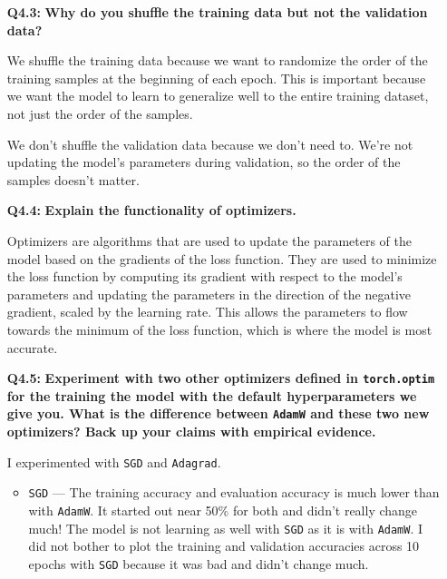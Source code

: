 \documentclass{article}
\begin{document}
\begin{itemize}
\begin{itemize}
        \item[\textbf{Q4.3:}] \textbf{Why do you shuffle the training data but
        not the validation data?}

        We shuffle the training data because we want to randomize the order of
        the training samples at the beginning of each epoch. This is important
        because we want the model to learn to generalize well to the entire
        training dataset, not just the order of the samples.

        We don't shuffle the validation data because we don't need to. We're not
        updating the model's parameters during validation, so the order of the
        samples doesn't matter.
        
        \item[\textbf{Q4.4:}] \textbf{Explain the functionality of optimizers.}
        
        Optimizers are algorithms that are used to update the parameters of the
        model based on the gradients of the loss function. They are used to
        minimize the loss function by computing its gradient with respect to the
        model's parameters and updating the parameters in the direction of the
        negative gradient, scaled by the learning rate. This allows the
        parameters to flow towards the minimum of the loss function, which is
        where the model is most accurate.
        
        \item[\textbf{Q4.5:}] \textbf{Experiment with two other optimizers
        defined in \texttt{torch.optim} for the training the model with the
        default hyperparameters we give you. What is the difference between
        \texttt{AdamW} and these two new optimizers? Back up your claims with
        empirical evidence.}

        I experimented with \texttt{SGD} and \texttt{Adagrad}.

        \begin{itemize}
            \item \texttt{SGD} --- The training accuracy and evaluation accuracy
            is much lower than with \texttt{AdamW}. It started out near 50\% for
            both and didn't really change much! The model is not learning as
            well with \texttt{SGD} as it is with \texttt{AdamW}. I did not
            bother to plot the training and validation accuracies across 10
            epochs with \texttt{SGD} because it was bad and didn't change much.


\end{itemize}
\end{itemize}
\end{itemize}
\end{document}
